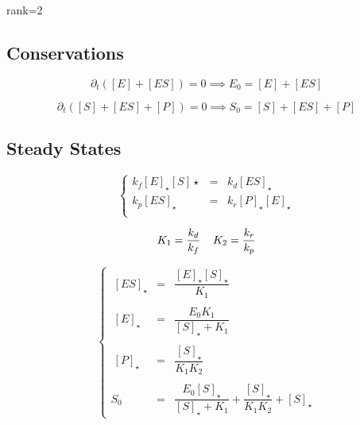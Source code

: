 \documentclass[aps,12pt]{revtex4}
\begin{document}
rank=2

\subsection{Conservations}
\begin{equation}
	\partial_t ( [E] + [ES] ) = 0 \implies E_0 = [E] + [ES]
\end{equation}

\begin{equation}
	\partial_t ( [S] + [ES] + [P]) = 0 \implies S_0 = [S] + [ES] + [P]
\end{equation}

\subsection{Steady States}

\begin{equation}
\left\lbrace
\begin{array}{rcl}
	k_f [E]_\star[S]\star & = & k_d [ES]_\star\\
	k_p [ES]_\star        & = & k_r [P]_\star[E]_\star \\
\end{array}
\right.
\end{equation}

\begin{equation}
	K_1 = \dfrac{k_d}{k_f} \;\;\;\; K_2 = \dfrac{k_r}{k_p}\\
\end{equation}

\begin{equation}
\left\lbrace
\begin{array}{rcl}
 		~[ES]_\star & = & \dfrac{[E]_\star[S]_\star}{K_1} \\
		\\
		~[E]_\star  & = & \dfrac{E_0K_1}{ [S]_\star + K_1} \\
		\\
		~[P]_\star  & = & \dfrac{[S]_\star}{K_1K_2}\\
		\\
		S_0 & = & \dfrac{E_0 [S]_\star}{[S]_\star+K_1} + \dfrac{[S]_\star}{K_1K_2} + [S]_\star
\end{array}
\right.
\end{equation}
\end{document}

